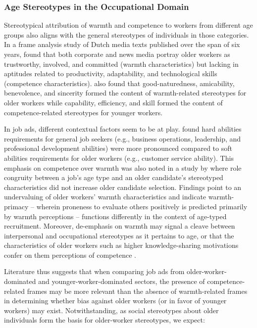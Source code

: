 \documentclass[man]{apa7}
\begin{document}
\subsubsection{Age Stereotypes in the Occupational Domain}
Stereotypical attribution of warmth and competence to workers from different age groups also aligns with the general stereotypes of individuals in those categories. In a frame analysis study of Dutch media texts published over the span of six years, \Textcite{kroon_reliable_2018} found that both corporate and news media portray older workers as trustworthy, involved, and committed (warmth characteristics) but lacking in aptitudes related to productivity, adaptability, and technological skills (competence characteristics). \Textcite{krings_stereotypical_2011} also found that good-naturedness, amicability, benevolence, and sincerity formed the content of warmth-related stereotypes for older workers while capability, efficiency, and skill formed the content of competence-related stereotypes for younger workers.

In job ads, different contextual factors seem to be at play. \Textcite{van_selm_search_2021} found hard abilities requirements for general job seekers (e.g., business operations, leadership, and professional development abilities) were more pronounced compared to soft abilities requirements for older workers (e.g., customer service ability). This emphasis on competence over warmth was also noted in a study by \Textcite{Abraham2015} where role congruity between a job’s age type and an older candidate’s stereotyped characteristics did not increase older candidate selection. Findings point to an undervaluing of older workers’ warmth characteristics and indicate warmth-primacy – wherein proneness to evaluate others positively is predicted primarily by warmth perceptions \parencite{cuddy2008WarmthCompetenceUniversal, ponsi_influence_2016} – functions differently in the context of age-typed recruitment. Moreover, de-emphasis on warmth may signal a cleave between interpersonal and occupational stereotypes as it pertains to age, or that the characteristics of older workers such as higher knowledge-sharing motivations confer on them perceptions of competence \parencite{burmeister_understanding_2020}.

Literature thus suggests that when comparing job ads from older-worker-dominated and younger-worker-dominated sectors, the presence of competence-related frames may be more relevant than the absence of warmth-related frames in determining whether bias against older workers (or in favor of younger workers) may exist. Notwithstanding, as social stereotypes about older individuals form the basis for older-worker stereotypes, we expect:
\end{document}
